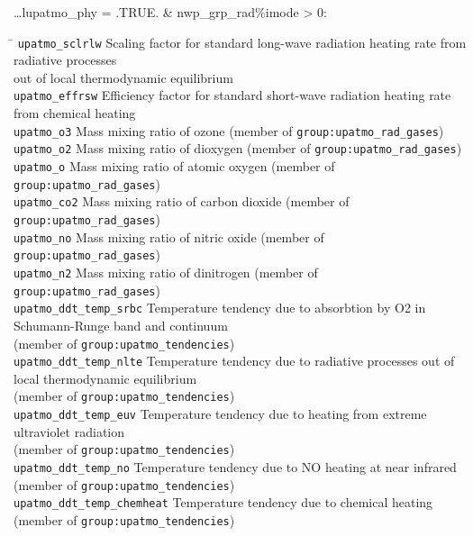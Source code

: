 \ldots lupatmo\_phy = .TRUE. \& nwp\_grp\_rad\%imode > 0:
\begin{tabbing}
\hspace*{0.4\textwidth} \= \kill
\texttt{upatmo\_sclrlw}  \> Scaling factor for standard long-wave radiation heating rate
from radiative processes \\
                         \> out of local thermodynamic equilibrium \\
\texttt{upatmo\_effrsw}  \> Efficiency factor for standard short-wave radiation heating rate
from chemical heating \\
\texttt{upatmo\_o3}      \> Mass mixing ratio of ozone (member of \texttt{group:upatmo\_rad\_gases}) \\
\texttt{upatmo\_o2}      \> Mass mixing ratio of dioxygen (member of \texttt{group:upatmo\_rad\_gases}) \\
\texttt{upatmo\_o}       \> Mass mixing ratio of atomic oxygen (member of \texttt{group:upatmo\_rad\_gases}) \\
\texttt{upatmo\_co2}     \> Mass mixing ratio of carbon dioxide (member of \texttt{group:upatmo\_rad\_gases}) \\
\texttt{upatmo\_no}      \> Mass mixing ratio of nitric oxide (member of \texttt{group:upatmo\_rad\_gases}) \\
\texttt{upatmo\_n2}      \> Mass mixing ratio of dinitrogen (member of \texttt{group:upatmo\_rad\_gases}) \\
\texttt{upatmo\_ddt\_temp\_srbc}  \> Temperature tendency due to
absorbtion by O2 in Schumann-Runge band and continuum \\
                                  \> (member of \texttt{group:upatmo\_tendencies}) \\
\texttt{upatmo\_ddt\_temp\_nlte}  \> Temperature tendency due to
radiative processes out of local thermodynamic equilibrium \\
                                  \> (member of \texttt{group:upatmo\_tendencies}) \\
\texttt{upatmo\_ddt\_temp\_euv}   \> Temperature tendency due to
heating from extreme ultraviolet radiation \\
                                  \> (member of \texttt{group:upatmo\_tendencies}) \\
\texttt{upatmo\_ddt\_temp\_no}    \> Temperature tendency due to
NO heating at near infrared (member of \texttt{group:upatmo\_tendencies}) \\
\texttt{upatmo\_ddt\_temp\_chemheat}   \> Temperature tendency due to
chemical heating (member of \texttt{group:upatmo\_tendencies})
\end{tabbing}



